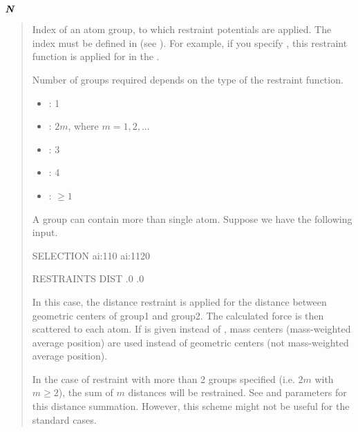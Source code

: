 \documentclass[a4paper,11pt,oneside,english]{sphinxmanual}
\begin{document}
\(\textbf{\textit{N}}\) 
\begin{quote}


Index of an atom group, to which restraint potentials are applied.
The index must be defined in \sphinxstylestrong{{[}SELECTION{]}} (see {\hyperref[\detokenize{11_Selection:selection}]{}}).
For example, if you specify , this restraint function
is applied for  in the \sphinxstylestrong{{[}SELECTION{]}}.

Number of groups required depends on the type of the restraint function.
\begin{itemize}
\item {} 
: 1

\item {} 
: \(2m\), where \(m = 1, 2, ...\)

\item {} 
: 3

\item {} 
: 4

\item {} 
: \(\ge 1\)

\end{itemize}

A group can contain more than single atom.
Suppose we have the following input.

\begin{sphinxVerbatim}[commandchars=\\\{\}]
\PYG{o}{[}SELECTION\PYG{o}{]}
         ai:1\PYGZhy{}10
         ai:11\PYGZhy{}20

\PYG{o}{[}RESTRAINTS\PYG{o}{]}
     
      DIST
      .0
     .0
   
\end{sphinxVerbatim}

In this case, the distance restraint is applied for the distance between
geometric centers of group1 and group2. The calculated force is then
scattered to each atom. If  is given instead of ,
mass centers (mass-weighted average position) are used instead of
geometric centers (not mass-weighted average position).

In the case of  restraint with more than 2 groups specified
(i.e. \(2m\) with \(m \geq 2\)),
the sum of \(m\) distances will be restrained. See 
and  parameters for this distance summation.
However, this scheme might not be useful for the standard cases.
\end{quote}
\end{document}
